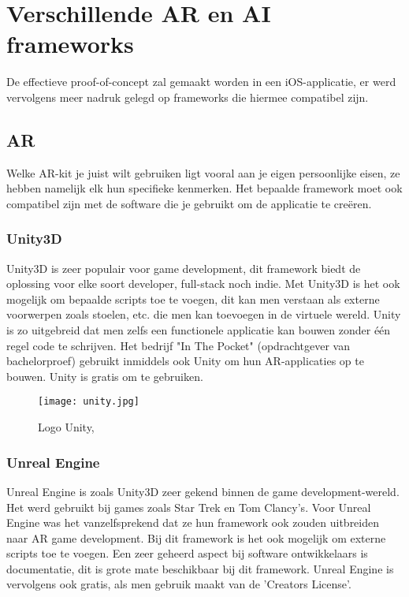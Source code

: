 \section{Verschillende AR en AI frameworks}

De effectieve proof-of-concept zal gemaakt worden in een iOS-applicatie, er werd vervolgens meer nadruk gelegd op frameworks die hiermee compatibel zijn.
\subsection{AR}
Welke AR-kit je juist wilt gebruiken ligt vooral aan je eigen persoonlijke eisen, ze hebben namelijk elk hun specifieke kenmerken. Het bepaalde framework moet ook compatibel zijn met de software die je gebruikt om de applicatie te creëren.
\subsubsection{Unity3D}
Unity3D is zeer populair voor game development, dit framework biedt de oplossing voor elke soort developer, full-stack noch indie. Met Unity3D is het ook mogelijk om bepaalde scripts toe te voegen, dit kan men verstaan als externe voorwerpen zoals stoelen, etc. die men kan toevoegen in de virtuele wereld. Unity is zo uitgebreid dat men zelfs een functionele applicatie kan bouwen zonder één regel code te schrijven. Het bedrijf "In The Pocket" (opdrachtgever van bachelorproef) gebruikt inmiddels ook Unity om hun AR-applicaties op te bouwen. Unity is gratis om te gebruiken. \autocite{Arshed2018}

\begin{figure}[H]
	\centering
	\texttt{[image: unity.jpg]}
	\caption{Logo Unity, \autocite{Unity2019}}
\end{figure}

\subsubsection{Unreal Engine}
Unreal Engine is zoals Unity3D zeer gekend binnen de game development-wereld. Het werd gebruikt bij games zoals Star Trek en Tom Clancy's. Voor Unreal Engine was het vanzelfsprekend dat ze hun framework ook zouden uitbreiden naar 	AR game development. Bij dit framework is het ook mogelijk om externe scripts toe te voegen. Een zeer geheerd aspect bij software ontwikkelaars is documentatie, dit is grote mate beschikbaar bij dit framework. Unreal Engine is vervolgens ook gratis, als men gebruik maakt van de 'Creators License'.  \autocite{Arshed2018}

